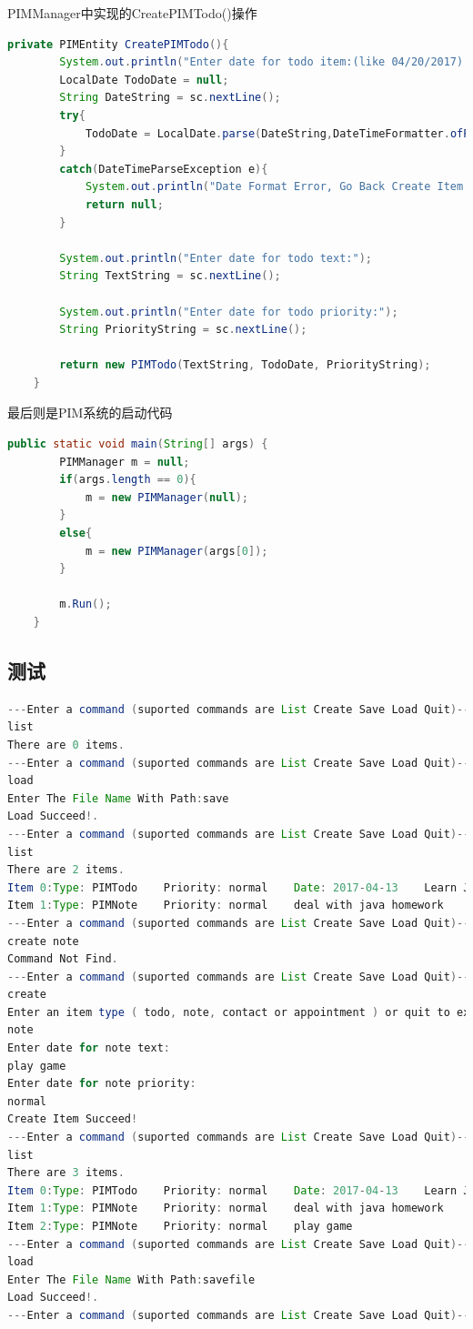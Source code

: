 \documentclass[a4paper]{article}
\begin{document}
PIMManager中实现的CreatePIMTodo()操作

\begin{lstlisting}[language=Java]
    private PIMEntity CreatePIMTodo(){
        System.out.println("Enter date for todo item:(like 04/20/2017):");
        LocalDate TodoDate = null;
        String DateString = sc.nextLine();
        try{
            TodoDate = LocalDate.parse(DateString,DateTimeFormatter.ofPattern("MM/dd/yyyy"));
        }
        catch(DateTimeParseException e){
            System.out.println("Date Format Error, Go Back Create Item.");
            return null;
        }

        System.out.println("Enter date for todo text:");
        String TextString = sc.nextLine();

        System.out.println("Enter date for todo priority:");
        String PriorityString = sc.nextLine();

        return new PIMTodo(TextString, TodoDate, PriorityString);
    }
\end{lstlisting}

最后则是PIM系统的启动代码

\begin{lstlisting}[language=Java]
    public static void main(String[] args) {
        PIMManager m = null;
        if(args.length == 0){
            m = new PIMManager(null);
        }
        else{
            m = new PIMManager(args[0]);
        }
        
        m.Run();
    }
\end{lstlisting}

\subsection{测试}
\begin{lstlisting}[language=Java,numbers=none]
---Enter a command (suported commands are List Create Save Load Quit)---
list
There are 0 items.
---Enter a command (suported commands are List Create Save Load Quit)---
load
Enter The File Name With Path:save
Load Succeed!.
---Enter a command (suported commands are List Create Save Load Quit)---
list
There are 2 items.
Item 0:Type: PIMTodo    Priority: normal    Date: 2017-04-13    Learn Java
Item 1:Type: PIMNote    Priority: normal    deal with java homework
---Enter a command (suported commands are List Create Save Load Quit)---
create note
Command Not Find.
---Enter a command (suported commands are List Create Save Load Quit)---
create
Enter an item type ( todo, note, contact or appointment ) or quit to exit create item
note
Enter date for note text:
play game
Enter date for note priority:
normal
Create Item Succeed!
---Enter a command (suported commands are List Create Save Load Quit)---
list
There are 3 items.
Item 0:Type: PIMTodo    Priority: normal    Date: 2017-04-13    Learn Java
Item 1:Type: PIMNote    Priority: normal    deal with java homework
Item 2:Type: PIMNote    Priority: normal    play game
---Enter a command (suported commands are List Create Save Load Quit)---
load
Enter The File Name With Path:savefile
Load Succeed!.
---Enter a command (suported commands are List Create Save Load Quit)---
\end{lstlisting}
\end{document}
